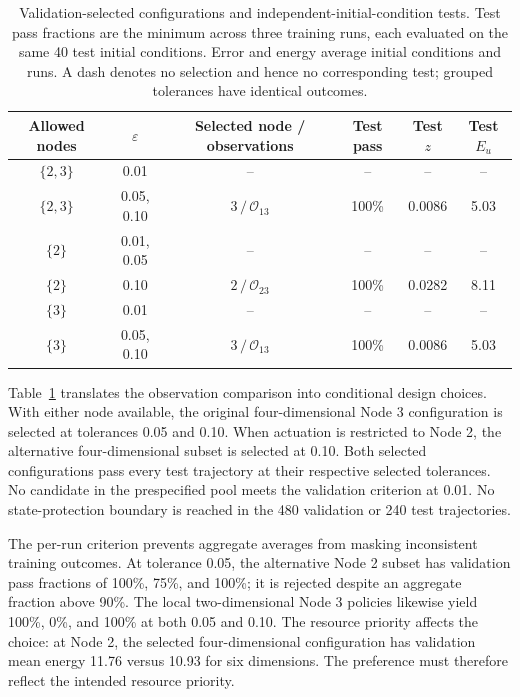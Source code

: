 \documentclass[a4paper,fleqn]{cas-sc}
\theoremstyle{plain}
\theoremstyle{definition}
\begin{document}
\begin{table}[pos=!t,width=\textwidth]
\centering
\caption{Validation-selected configurations and independent-initial-condition tests. Test pass fractions are the minimum across three training runs, each evaluated on the same 40 test initial conditions. Error and energy average initial conditions and runs. A dash denotes no selection and hence no corresponding test; grouped tolerances have identical outcomes.}
\label{tab:configuration_selection}
\small
\begin{tabular}{cccccc}
\toprule
Allowed nodes & $\varepsilon$ & Selected node / observations & Test pass & Test $z$ & Test $E_u$\\
\midrule
$\{2,3\}$ & 0.01 & -- & -- & -- & --\\
$\{2,3\}$ & 0.05, 0.10 & $3\,/\,\mathcal O_{13}$ & 100\% & 0.0086 & 5.03\\
$\{2\}$ & 0.01, 0.05 & -- & -- & -- & --\\
$\{2\}$ & 0.10 & $2\,/\,\mathcal O_{23}$ & 100\% & 0.0282 & 8.11\\
$\{3\}$ & 0.01 & -- & -- & -- & --\\
$\{3\}$ & 0.05, 0.10 & $3\,/\,\mathcal O_{13}$ & 100\% & 0.0086 & 5.03\\
\bottomrule
\end{tabular}
\end{table}

Table~\ref{tab:configuration_selection} translates the observation comparison into conditional design choices. With either node available, the original four-dimensional Node 3 configuration is selected at tolerances 0.05 and 0.10. When actuation is restricted to Node 2, the alternative four-dimensional subset is selected at 0.10. Both selected configurations pass every test trajectory at their respective selected tolerances. No candidate in the prespecified pool meets the validation criterion at 0.01. No state-protection boundary is reached in the 480 validation or 240 test trajectories.

The per-run criterion prevents aggregate averages from masking inconsistent training outcomes. At tolerance 0.05, the alternative Node 2 subset has validation pass fractions of 100\%, 75\%, and 100\%; it is rejected despite an aggregate fraction above 90\%. The local two-dimensional Node 3 policies likewise yield 100\%, 0\%, and 100\% at both 0.05 and 0.10. The resource priority affects the choice: at Node 2, the selected four-dimensional configuration has validation mean energy 11.76 versus 10.93 for six dimensions. The preference must therefore reflect the intended resource priority.
\end{document}
